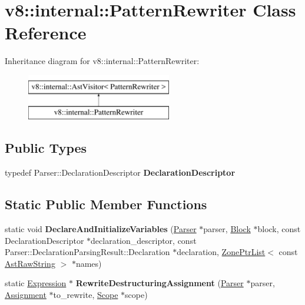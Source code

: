 \hypertarget{classv8_1_1internal_1_1PatternRewriter}{}\section{v8\+:\+:internal\+:\+:Pattern\+Rewriter Class Reference}
\label{classv8_1_1internal_1_1PatternRewriter}
Inheritance diagram for v8\+:\+:internal\+:\+:Pattern\+Rewriter\+:\begin{figure}[H]
\begin{center}
\leavevmode
\includegraphics[height=2.000000cm]{classv8_1_1internal_1_1PatternRewriter}
\end{center}
\end{figure}
\subsection*{Public Types}
\begin{DoxyCompactItemize}
\item 
\mbox{\label{classv8_1_1internal_1_1PatternRewriter_a91b9be61dcf77ac73e95b95b0c3d07ad}} 
typedef Parser\+::\+Declaration\+Descriptor {\bfseries Declaration\+Descriptor}
\end{DoxyCompactItemize}
\subsection*{Static Public Member Functions}
\begin{DoxyCompactItemize}
\item 
\mbox{\label{classv8_1_1internal_1_1PatternRewriter_aa384d06c4a9b51d93ff05d7c7a36056f}} 
static void {\bfseries Declare\+And\+Initialize\+Variables} (\mbox{\hyperlink{classv8_1_1internal_1_1Parser}{Parser}} $\ast$parser, \mbox{\hyperlink{classv8_1_1internal_1_1Block}{Block}} $\ast$block, const Declaration\+Descriptor $\ast$declaration\+\_\+descriptor, const Parser\+::\+Declaration\+Parsing\+Result\+::\+Declaration $\ast$declaration, \mbox{\hyperlink{classv8_1_1internal_1_1ZoneList}{Zone\+Ptr\+List}}$<$ const \mbox{\hyperlink{classv8_1_1internal_1_1AstRawString}{Ast\+Raw\+String}} $>$ $\ast$names)
\item 
\mbox{\label{classv8_1_1internal_1_1PatternRewriter_a71abc707e7964d64da414904c66455bc}} 
static \mbox{\hyperlink{classv8_1_1internal_1_1Expression}{Expression}} $\ast$ {\bfseries Rewrite\+Destructuring\+Assignment} (\mbox{\hyperlink{classv8_1_1internal_1_1Parser}{Parser}} $\ast$parser, \mbox{\hyperlink{classv8_1_1internal_1_1Assignment}{Assignment}} $\ast$to\+\_\+rewrite, \mbox{\hyperlink{classv8_1_1internal_1_1Scope}{Scope}} $\ast$scope)
\end{DoxyCompactItemize}
